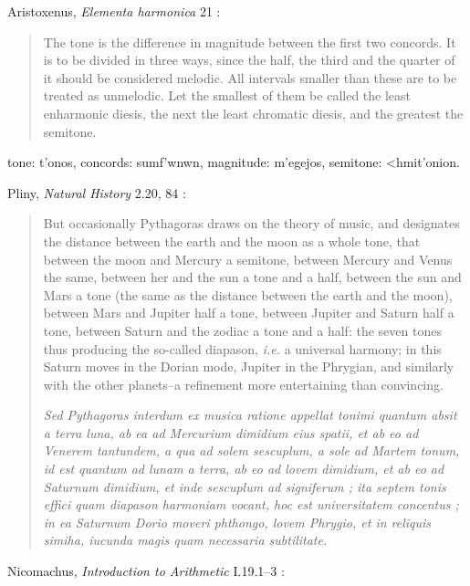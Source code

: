 \documentclass{amsart}
\newcommand{\textgreek}[1]{\begingroup\fontencoding{LGR}\selectfont#1\endgroup}
\theoremstyle{definition}
\begin{document}
Aristoxenus, {\em Elementa harmonica} 21 \cite[p.~140]{barker}:

\begin{quote}
The tone is the difference in magnitude between the first two
concords. It is to be divided in three ways, since the half, the third and the
quarter of it should be considered melodic. All intervals smaller than these are
to be treated as unmelodic. Let the smallest of them be called the least
enharmonic diesis, the next the least chromatic diesis, and the greatest the
semitone.
\end{quote}

tone: \textgreek{t'onos},
concords: \textgreek{sumf'wnwn},
magnitude: \textgreek{m'egejos},
semitone: \textgreek{<hmit'onion}.

Pliny, {\em Natural History} 2.20, 84 \cite[pp.~226--229]{LCL330}:

\begin{quote}
But occasionally Pythagoras draws on the
theory of music, and designates the distance between
the earth and the moon as a whole tone, that between
the moon and Mercury a semitone, between Mercury
and Venus the same, between her and the sun a tone and a half, between the sun and Mars a tone (the same as the distance between the earth and the
moon), between Mars and Jupiter half a tone,
between Jupiter and Saturn half a tone, between
Saturn and the zodiac a tone and a half: the seven
tones thus producing the so-called diapason, {\em i.e.} a universal harmony;
in this Saturn moves in the Dorian mode, Jupiter in the Phrygian, and similarly
with the other planets--a refinement more entertaining
than convincing.

{\em Sed Pythagoras interdum ex musica ratione appellat tonimi quantum absit a terra luna, ab ea ad
Mercurium dimidium eius spatii, et ab eo ad Venerem
tantundem, a qua ad solem sescuplum, a sole ad
Martem tonum, id est quantum ad lunam a terra,
ab eo ad lovem dimidium, et ab eo ad Saturnum
dimidium, et inde sescuplum ad signiferum ; ita septem tonis effici quam diapason harmoniam vocant,
hoc est universitatem concentus ; in ea Saturnum
Dorio moveri phthongo, lovem Phrygio, et in reliquis
simiha, iucunda magis quam necessaria subtilitate.}
\end{quote}

Nicomachus, {\em Introduction to Arithmetic} I.19.1--3 \cite[p.~215]{nicomachus}:
\end{document}
